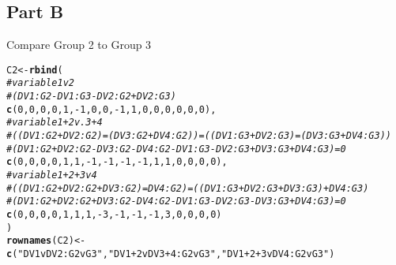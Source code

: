 \documentclass{article}\usepackage[]{graphicx}\usepackage[]{color}
\makeatletter
\newcommand{\hlnum}[1]{\textcolor[rgb]{0.686,0.059,0.569}{#1}}%
\newcommand{\hlstr}[1]{\textcolor[rgb]{0.192,0.494,0.8}{#1}}%
\newcommand{\hlcom}[1]{\textcolor[rgb]{0.678,0.584,0.686}{\textit{#1}}}%
\newcommand{\hlopt}[1]{\textcolor[rgb]{0,0,0}{#1}}%
\newcommand{\hlstd}[1]{\textcolor[rgb]{0.345,0.345,0.345}{#1}}%
\newcommand{\hlkwb}[1]{\textcolor[rgb]{0.69,0.353,0.396}{#1}}%
\newcommand{\hlkwd}[1]{\textcolor[rgb]{0.737,0.353,0.396}{\textbf{#1}}}%
\newenvironment{kframe}{%
 \def\at@end@of@kframe{}%
 \ifinner\ifhmode%
  \def\at@end@of@kframe{\end{minipage}}%
  \begin{minipage}{\columnwidth}%
 \fi\fi%
 \def\FrameCommand##1{\hskip\@totalleftmargin \hskip-\fboxsep
 \colorbox{shadecolor}{##1}\hskip-\fboxsep
     \hskip-\linewidth \hskip-\@totalleftmargin \hskip\columnwidth}%
 \MakeFramed {\advance\hsize-\width
   \@totalleftmargin\z@ \linewidth\hsize
   \@setminipage}}%
 {\par\unskip\endMakeFramed%
 \at@end@of@kframe}
\newenvironment{knitrout}{}{} %
\makeatother
\begin{document}
\subsection{Part B}
Compare Group 2 to Group 3
\begin{knitrout}
\color{fgcolor}\begin{kframe}
\begin{alltt}
\hlstd{C2} \hlkwb{<-} \hlkwd{rbind}\hlstd{(}
  \hlcom{# variable 1 v 2}
  \hlcom{# (DV1:G2 - DV1:G3 - DV2:G2 + DV2:G3)}
  \hlkwd{c}\hlstd{(}\hlnum{0}\hlstd{,}\hlnum{0}\hlstd{,}\hlnum{0}\hlstd{,}\hlnum{0}\hlstd{,} \hlnum{1}\hlstd{,}\hlopt{-}\hlnum{1}\hlstd{,}\hlnum{0}\hlstd{,}\hlnum{0}\hlstd{,} \hlopt{-}\hlnum{1}\hlstd{,}\hlnum{1}\hlstd{,}\hlnum{0}\hlstd{,}\hlnum{0}\hlstd{,} \hlnum{0}\hlstd{,}\hlnum{0}\hlstd{,}\hlnum{0}\hlstd{,}\hlnum{0}\hlstd{),}
  \hlcom{# variable 1+2 v. 3+4}
  \hlcom{# ((DV1:G2 + DV2:G2) = (DV3:G2 + DV4:G2)) = ((DV1:G3 + DV2:G3) = (DV3:G3 + DV4:G3))}
  \hlcom{# (DV1:G2 + DV2:G2 -DV3:G2 -DV4:G2 -DV1:G3 - DV2:G3 + DV3:G3 + DV4:G3) = 0}
  \hlkwd{c}\hlstd{(}\hlnum{0}\hlstd{,}\hlnum{0}\hlstd{,}\hlnum{0}\hlstd{,}\hlnum{0}\hlstd{,} \hlnum{1}\hlstd{,} \hlnum{1}\hlstd{,}\hlopt{-}\hlnum{1}\hlstd{,}\hlopt{-}\hlnum{1}\hlstd{,} \hlopt{-}\hlnum{1}\hlstd{,}\hlopt{-}\hlnum{1}\hlstd{,}\hlnum{1}\hlstd{,}\hlnum{1}\hlstd{,} \hlnum{0}\hlstd{,}\hlnum{0}\hlstd{,}\hlnum{0}\hlstd{,}\hlnum{0}\hlstd{),}
  \hlcom{# variable 1+2+3 v 4}
  \hlcom{# ((DV1:G2 + DV2:G2 + DV3:G2) = DV4:G2) = ((DV1:G3 + DV2:G3 + DV3:G3) + DV4:G3)}
  \hlcom{# (DV1:G2 + DV2:G2 + DV3:G2 - DV4:G2 - DV1:G3 - DV2:G3 -DV3:G3 + DV4:G3) = 0}
  \hlkwd{c}\hlstd{(}\hlnum{0}\hlstd{,}\hlnum{0}\hlstd{,}\hlnum{0}\hlstd{,}\hlnum{0}\hlstd{,} \hlnum{1}\hlstd{,}\hlnum{1}\hlstd{,}\hlnum{1}\hlstd{,}\hlopt{-}\hlnum{3}\hlstd{,} \hlopt{-}\hlnum{1}\hlstd{,}\hlopt{-}\hlnum{1}\hlstd{,}\hlopt{-}\hlnum{1}\hlstd{,}\hlnum{3}\hlstd{,} \hlnum{0}\hlstd{,}\hlnum{0}\hlstd{,}\hlnum{0}\hlstd{,}\hlnum{0}\hlstd{)}
\hlstd{)}
\hlkwd{rownames}\hlstd{(C2)} \hlkwb{<-} \hlkwd{c}\hlstd{(}\hlstr{"DV1vDV2:G2vG3"}\hlstd{,} \hlstr{"DV1+2vDV3+4:G2vG3"}\hlstd{,} \hlstr{"DV1+2+3vDV4:G2vG3"}\hlstd{)}
\end{alltt}
\end{kframe}
\end{knitrout}
\end{document}
